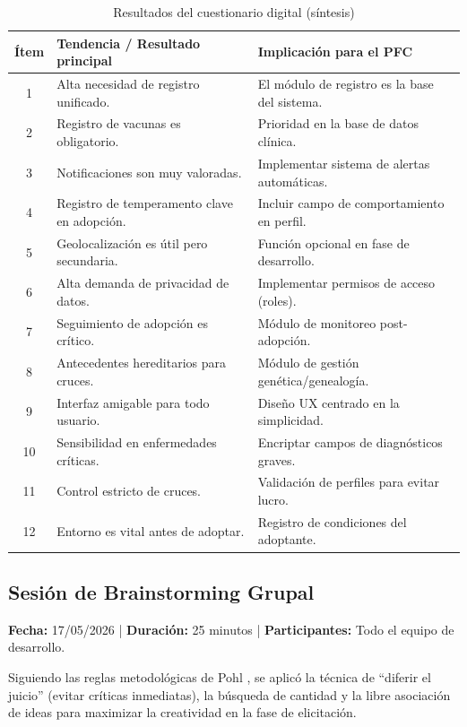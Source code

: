 \documentclass[journal,onecolumn]{IEEEtran}
\begin{document}
\begin{table}[H]
\caption{Resultados del cuestionario digital (síntesis)}
\label{tab:cuestionario}
\begin{tabularx}{\textwidth}{|c|X|l|}
\hline
\textbf{Ítem} & \textbf{Tendencia / Resultado principal} & \textbf{Implicación para el PFC} \\
\hline
1  & Alta necesidad de registro unificado. & El módulo de registro es la base del sistema. \\
\hline
2  & Registro de vacunas es obligatorio. & Prioridad en la base de datos clínica. \\
\hline
3  & Notificaciones son muy valoradas. & Implementar sistema de alertas automáticas. \\
\hline
4  & Registro de temperamento clave en adopción. & Incluir campo de comportamiento en perfil. \\
\hline
5  & Geolocalización es útil pero secundaria. & Función opcional en fase de desarrollo. \\
\hline
6  & Alta demanda de privacidad de datos. & Implementar permisos de acceso (roles). \\
\hline
7  & Seguimiento de adopción es crítico. & Módulo de monitoreo post-adopción. \\
\hline
8  & Antecedentes hereditarios para cruces. & Módulo de gestión genética/genealogía. \\
\hline
9  & Interfaz amigable para todo usuario. & Diseño UX centrado en la simplicidad. \\
\hline
10 & Sensibilidad en enfermedades críticas. & Encriptar campos de diagnósticos graves. \\
\hline
11 & Control estricto de cruces. & Validación de perfiles para evitar lucro. \\
\hline
12 & Entorno es vital antes de adoptar. & Registro de condiciones del adoptante. \\
\hline
\end{tabularx}
\end{table}

\subsection{Sesión de Brainstorming Grupal}

\textbf{Fecha:} 17/05/2026 | \textbf{Duración:} 25 minutos |
\textbf{Participantes:} Todo el equipo de desarrollo.

Siguiendo las reglas metodológicas de Pohl \cite{pohl2025}, se aplicó la
técnica de ``diferir el juicio'' (evitar críticas inmediatas), la búsqueda
de cantidad y la libre asociación de ideas para maximizar la creatividad en
la fase de elicitación.
\end{document}
